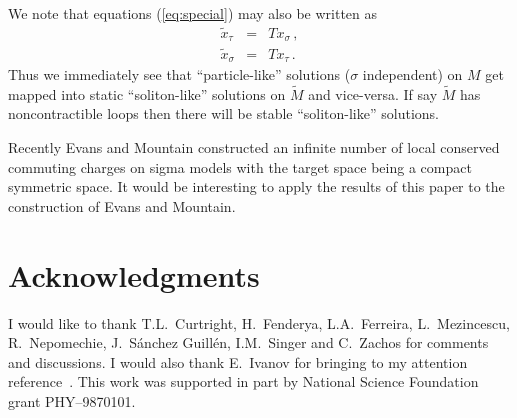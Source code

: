 \documentclass[a4paper,12pt]{article}
\newcommand{\Mtil}{\widetilde{M}}
\newcommand{\xtil}{\tilde{x}}
\begin{document}
We note that equations (\ref{eq:special}) may also be written as
\begin{eqnarray}
    \xtil_{\tau} & = & T x_{\sigma}\,,
    \label{eq:psd00}  \\
    \xtil_{\sigma} & = & T x_{\tau}\,.
    \label{eq:psd11}
\end{eqnarray}
Thus we immediately see that ``particle-like'' solutions ($\sigma$ 
independent) on $M$ get mapped into static ``soliton-like'' solutions 
on $\Mtil$ and vice-versa. If say $\Mtil$ has noncontractible loops 
then there will be stable ``soliton-like'' solutions.

Recently Evans and Mountain \cite{Evans:2000qx} constructed an
infinite number of local conserved commuting charges on sigma models
with the target space being a compact symmetric space.  It would be
interesting to apply the results of this paper to the construction of
Evans and Mountain.

\section*{Acknowledgments}

I would like to thank T.L.~Curtright, H.~Fenderya, L.A.~Ferreira,
L.~Mezincescu, R.~Nepomechie, J.~S\'{a}nchez Guill\'{e}n, I.M.~Singer
and C.~Zachos for comments and discussions.  I would also thank
E.~Ivanov for bringing to my attention reference~\cite{Ivanov:1987yv}. 
This work was supported in part by National Science Foundation grant
PHY--9870101.
\end{document}
